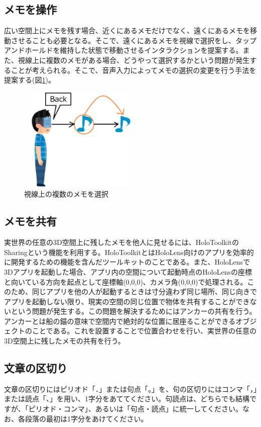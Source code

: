 \documentclass{hissymp}
\begin{document}
\subsection{メモを操作}
広い空間上にメモを残す場合、近くにあるメモだけでなく、遠くにあるメモを移動させることも必要となる。そこで、遠くにあるメモを視線で選択をし、タップアンドホールドを維持した状態で移動させるインタラクションを提案する。また、視線上に複数のメモがある場合、どうやって選択するかという問題が発生することが考えられる。そこで、音声入力によってメモの選択の変更を行う手法を提案する(図\ref{fig:sentaku_memo})。

\begin{figure}[h]
  \begin{center}
    \includegraphics[clip,height=5.0cm,width=6.0cm]{./sentaku_memo.eps}
    \caption{視線上の複数のメモを選択}
    \label{fig:sentaku_memo}
  \end{center}
\end{figure}

\subsection{メモを共有}
実世界の任意の3D空間上に残したメモを他人に見せるには、HoloToolkit\cite{tex6}のSharing\cite{tex7}という機能を利用する。HoloToolkitとはHoloLens向けのアプリを効率的に開発するための機能を含んだツールキットのことである。また、HoloLensで3Dアプリを起動した場合、アプリ内の空間について起動時点のHoloLensの座標と向いている方向を起点として座標軸(0,0,0)、カメラ角(0,0,0)で処理される。このため、同じアプリを他の人が起動するときは寸分違わず同じ場所、同じ向きでアプリを起動しない限り、現実の空間の同じ位置で物体を共有することができないという問題が発生する。この問題を解決するためにはアンカーの共有を行う。アンカーとは船の錨の意味で空間内で絶対的な位置に居座ることができるオブジェクトのことである。これを設置することで位置合わせを行い、実世界の任意の3D空間上に残したメモの共有を行う。

\subsection{文章の区切り}
文章の区切りにはピリオド「．」または句点「。」を、句の区切りにはコンマ「，」または読点「、」を用い、1字分をあててください。句読点は、どちらでも結構ですが、「ピリオド・コンマ」、あるいは「句点・読点」に統一してください。なお、各段落の最初は1字分をあけてください。
\end{document}
